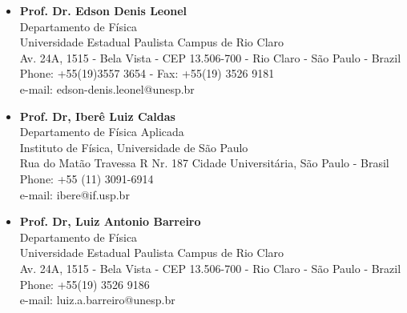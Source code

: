 \documentclass[margin,line]{resume}
\begin{document}
\begin{resume}
\begin{itemize}
    \item {\bf Prof. Dr. Edson Denis Leonel }  \\  Departamento de F\'isica  \\ Universidade Estadual Paulista Campus de Rio Claro \\Av. 24A, 1515 - Bela Vista - CEP 13.506-700 - Rio Claro - S\~ao Paulo - Brazil \\ Phone: +55(19)3557 3654 - Fax: +55(19) 3526 9181\\ e-mail: edson-denis.leonel@unesp.br \
    \item {\bf Prof. Dr, Iber\^e Luiz Caldas} \\ Departamento de F\'isica Aplicada \\ Instituto de F\'isica, Universidade de S\~ao Paulo
    \\ Rua do Mat\~ao Travessa R Nr. 187 Cidade Universit\'aria, S\~ao Paulo - Brasil \\ Phone: +55 (11) 3091-6914\\ e-mail: ibere@if.usp.br \ 
    \item {\bf Prof. Dr, Luiz Antonio Barreiro} \\ Departamento de F\'isica \\ Universidade Estadual Paulista Campus de Rio Claro \\Av. 24A, 1515 - Bela Vista - CEP 13.506-700 - Rio Claro - S\~ao Paulo - Brazil \\ Phone: +55(19) 3526 9186\\ e-mail: luiz.a.barreiro@unesp.br \
    
\end{itemize}





\end{resume}
\end{document}

